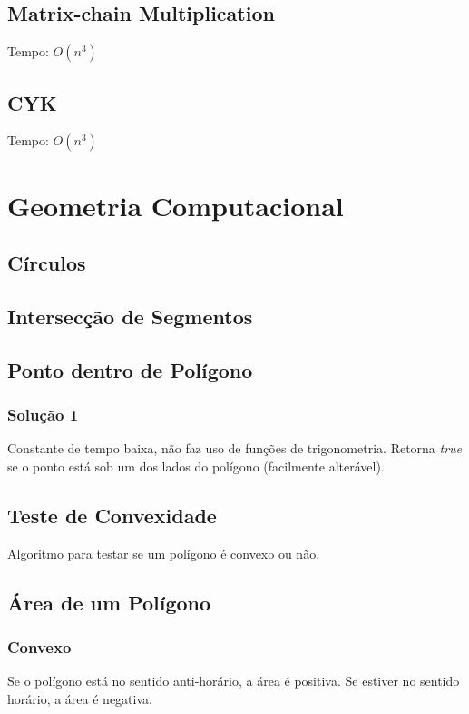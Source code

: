 \documentclass[12pt,a4paper]{article}
\begin{document}
		\subsection{Matrix-chain Multiplication}
			Tempo: \( O(n^3) \)
			
		\subsection{CYK}
			Tempo: \( O(n^3) \)
	\section{Geometria Computacional}
		
		\subsection{Círculos}
			
		\subsection{Intersecção de Segmentos}
			
		\subsection{Ponto dentro de Polígono}
			\subsubsection{Solução 1}
				Constante de tempo baixa, não faz uso de funções de trigonometria. Retorna \emph{true} se o ponto está sob um dos lados do polígono (facilmente alterável).
				
		\subsection{Teste de Convexidade}
			Algoritmo para testar se um polígono é convexo ou não.
		\subsection{Área de um Polígono}
			\subsubsection{Convexo}
				Se o polígono está no sentido anti-horário, a área é positiva. Se estiver no sentido horário, a área é negativa.
				
\end{document}
